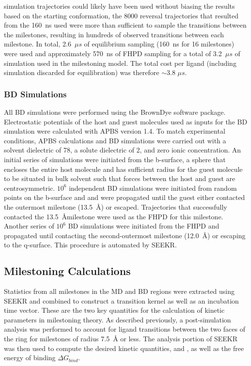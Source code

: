 simulation trajectories could likely have been used without biasing the results 
based on the starting conformation, the 8000 reversal trajectories that resulted 
from the 160~ns used were more than sufficient to sample the transitions between 
the milestones, resulting in hundreds of observed transitions between each milestone. 
In total, 2.6~${\mu}s$ of equilibrium sampling (160~ns for 16 milestones) were 
used and approximately 570~ns of FHPD sampling for a total of 3.2~${\mu}s$ of 
simulation used in the milestoning model. The total cost per ligand (including 
simulation discarded for equilibration) was therefore $\sim$3.8 ${\mu}s$. 

\subsubsection*{BD Simulations}
\par All BD simulations were performed using the BrownDye software package\cite{Huber2010}. 
Electrostatic potentials of the host and guest molecules used as inputs for the 
BD simulation were calculated with APBS version 1.4\cite{Baker2001}. To match 
experimental conditions, APBS calculations and BD simulations were carried out 
with a solvent dielectric of 78, a solute dielectric of 2, and zero ionic concentration. 
An initial series of simulations were initiated from the b-surface, a sphere that 
encloses the entire host molecule and has sufficient radius for the guest molecule 
to be situated in bulk solvent such that forces between the host and guest are centrosymmetric. 
$10^6$ independent BD simulations were initiated from random points on the b-surface 
and and were propagated until the guest either contacted the outermost milestone 
(13.5~\AA) or escaped. Trajectories that successfully contacted the 13.5~\AA milestone 
were used as the FHPD for this milestone. Another series of $10^6$ BD simulations 
were initiated from the FHPD and propagated until contacting the second-outermost 
milestone (12.0~\AA) or escaping to the q-surface. This procedure is automated by 
SEEKR.

\subsection*{Milestoning Calculations}
\par Statistics from all milestones in the MD and BD regions were extracted 
using SEEKR and combined to construct a transition kernel as well as an incubation 
time vector. These are the two key quantities for the calculation of kinetic 
parameters in milestoning theory.\cite{Faradjian2004} As described previously, 
a post-simulation analysis was performed to account for ligand transitions 
between the two faces of the \bcd ring for milestones of radius 7.5~\AA 
or less. The analysis portion of SEEKR was then used to compute the desired 
kinetic quantities, \kon and \koff, as well as the free energy of binding $\Delta G_{bind}$.
